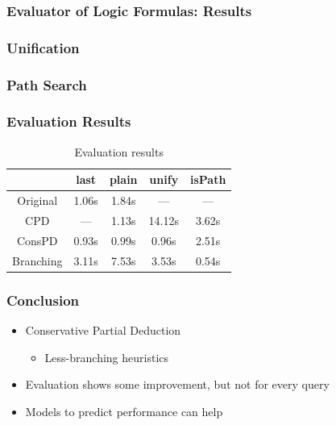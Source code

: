 \documentclass[xcolor=table]{beamer}
\begin{document}
\begin{frame}[fragile]
  \transwipe[direction=90]
  \frametitle{Evaluator of Logic Formulas: Results}
\end{frame}

\begin{frame}[fragile]
  \transwipe[direction=90]
  \frametitle{Unification}
\end{frame}

\begin{frame}[fragile]
  \transwipe[direction=90]
  \frametitle{Path Search}
\end{frame}

\begin{frame}[fragile]
  \transwipe[direction=90]
  \frametitle{Evaluation Results}

  \begin{table}
    \centering
    \begin{tabular}{c||c|c||c||c}
                     & last  & plain & unify  & isPath \\ \hline\hline
    Original         & 1.06s & 1.84s & ---    & ---    \\ \hline
    CPD              & ---   & 1.13s & 14.12s & 3.62s  \\ \hline
    ConsPD           & 0.93s & 0.99s & 0.96s  & 2.51s  \\ \hline
    Branching        & 3.11s & 7.53s & 3.53s  & 0.54s  \\ \hline
    \end{tabular}

    \caption{Evaluation results}
    \label{tbl:eval}
  \end{table}

\end{frame}

\begin{frame}[fragile]
  \transwipe[direction=90]
  \frametitle{Conclusion}
  \begin{itemize}
    \item Conservative Partial Deduction
    \begin{itemize}
      \item Less-branching heuristics
    \end{itemize}
    \item Evaluation shows some improvement, but not for every query
    \item Models to predict performance can help
  \end{itemize}
\end{frame}
\end{document}
